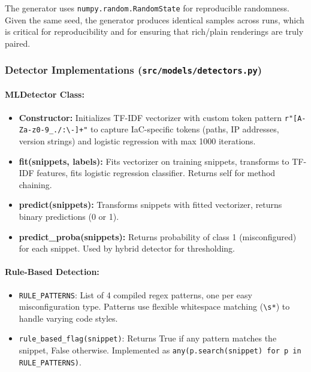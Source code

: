 The generator uses \texttt{numpy.random.RandomState} for reproducible randomness. Given the same seed, the generator produces identical samples across runs, which is critical for reproducibility and for ensuring that rich/plain renderings are truly paired.

\subsubsection{Detector Implementations (\texttt{src/models/detectors.py})}

\paragraph{MLDetector Class:}
\begin{itemize}
  \item \textbf{Constructor:} Initializes TF-IDF vectorizer with custom token pattern \texttt{r"[A-Za-z0-9\_./:\textbackslash{}-]+"} to capture IaC-specific tokens (paths, IP addresses, version strings) and logistic regression with max 1000 iterations.
  
  \item \textbf{fit(snippets, labels):} Fits vectorizer on training snippets, transforms to TF-IDF features, fits logistic regression classifier. Returns self for method chaining.
  
  \item \textbf{predict(snippets):} Transforms snippets with fitted vectorizer, returns binary predictions (0 or 1).
  
  \item \textbf{predict\_proba(snippets):} Returns probability of class 1 (misconfigured) for each snippet. Used by hybrid detector for thresholding.
\end{itemize}

\paragraph{Rule-Based Detection:}
\begin{itemize}
  \item \texttt{RULE\_PATTERNS}: List of 4 compiled regex patterns, one per easy misconfiguration type. Patterns use flexible whitespace matching (\texttt{\textbackslash{}s*}) to handle varying code styles.
  
  \item \texttt{rule\_based\_flag(snippet)}: Returns True if any pattern matches the snippet, False otherwise. Implemented as \texttt{any(p.search(snippet) for p in RULE\_PATTERNS)}.
\end{itemize}

